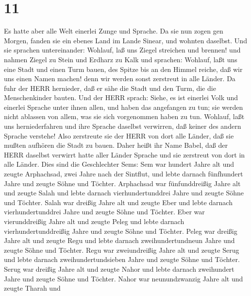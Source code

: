 \hypertarget{section-10}{%
\section{11}\label{section-10}}

 Es hatte aber alle Welt einerlei Zunge und Sprache.
 Da sie nun zogen gen Morgen, fanden sie ein ebenes Land im
Lande Sinear, und wohnten daselbst.  Und sie sprachen
untereinander: Wohlauf, laß uns Ziegel streichen und brennen! und nahmen
Ziegel zu Stein und Erdharz zu Kalk  und sprachen: Wohlauf,
laßt uns eine Stadt und einen Turm bauen, des Spitze bis an den Himmel
reiche, daß wir uns einen Namen machen! denn wir werden sonst zerstreut
in alle Länder.  Da fuhr der HERR hernieder, daß er sähe die
Stadt und den Turm, die die Menschenkinder bauten.  Und der
HERR sprach: Siehe, es ist einerlei Volk und einerlei Sprache unter
ihnen allen, und haben das angefangen zu tun; sie werden nicht ablassen
von allem, was sie sich vorgenommen haben zu tun.  Wohlauf,
laßt uns herniederfahren und ihre Sprache daselbst verwirren, daß keiner
des andern Sprache verstehe!  Also zerstreute sie der HERR
von dort alle Länder, daß sie mußten aufhören die Stadt zu bauen.
 Daher heißt ihr Name Babel, daß der HERR daselbst verwirrt
hatte aller Länder Sprache und sie zerstreut von dort in alle Länder.
 Dies sind die Geschlechter Sems: Sem war hundert Jahre alt
und zeugte Arphachsad, zwei Jahre nach der Sintflut,  und
lebte darnach fünfhundert Jahre und zeugte Söhne und Töchter.
 Arphachsad war fünfunddreißig Jahre alt und zeugte Salah
 und lebte darnach vierhundertunddrei Jahre und zeugte
Söhne und Töchter.  Salah war dreißig Jahre alt und zeugte
Eber  und lebte darnach vierhundertunddrei Jahre und zeugte
Söhne und Töchter.  Eber war vierunddreißig Jahre alt und
zeugte Peleg  und lebte darnach vierhundertunddreißig Jahre
und zeugte Söhne und Töchter.  Peleg war dreißig Jahre alt
und zeugte Regu  und lebte darnach zweihundertundneun Jahre
und zeugte Söhne und Töchter.  Regu war zweiundreißig Jahre
alt und zeugte Serug  und lebte darnach
zweihundertundsieben Jahre und zeugte Söhne und Töchter. 
Serug war dreißig Jahre alt und zeugte Nahor  und lebte
darnach zweihundert Jahre und zeugte Söhne und Töchter. 
Nahor war neunundzwanzig Jahre alt und zeugte Tharah  und
